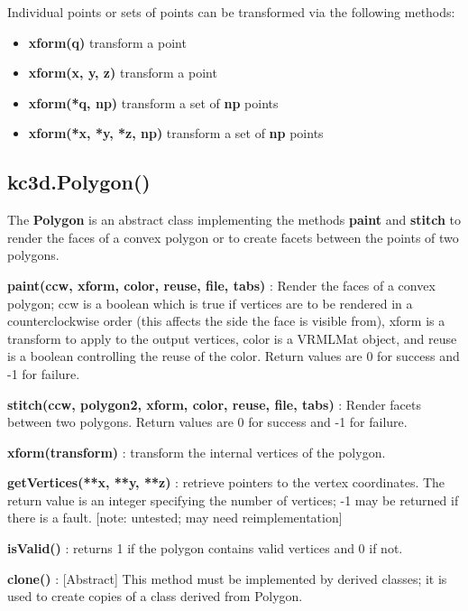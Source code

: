 \documentclass[a4paper, dvipdfm]{article}
\begin{document}
Individual points or sets of points can be transformed via the following methods:

\begin{itemize}
\item \textbf{xform(q)} transform a point\\
\item \textbf{xform(x, y, z)} transform a point\\
\item \textbf{xform(*q, np)} transform a set of \textbf{np} points\\
\item \textbf{xform(*x, *y, *z, np)} transform a set of \textbf{np} points\\
\end{itemize}

\subsection{kc3d.Polygon()}
The \textbf{Polygon} is an abstract class implementing the methods \textbf{paint}
and \textbf{stitch} to render the faces of a convex polygon or to create facets
between the points of two polygons.

\textbf{paint(ccw, xform, color, reuse, file, tabs)} : Render the faces of a convex polygon;
ccw is a boolean which is true if vertices are to be rendered in a counterclockwise order (this
affects the side the face is visible from), xform is a transform to apply to the output vertices,
color is a VRMLMat object, and reuse is a boolean controlling the reuse of the color.
Return values are 0 for success and -1 for failure.

\textbf{stitch(ccw, polygon2, xform, color, reuse, file, tabs)} : Render facets between two
polygons. Return values are 0 for success and -1 for failure.

\textbf{xform(transform)} : transform the internal vertices of the polygon.

\textbf{getVertices(**x, **y, **z)} : retrieve pointers to the vertex coordinates.
The return value is an integer specifying the number of vertices; -1 may be returned
if there is a fault. [note: untested; may need reimplementation]

\textbf{isValid()} : returns 1 if the polygon contains valid vertices and 0 if not.

\textbf{clone()} : [Abstract] This method must be implemented by derived classes;
it is used to create copies of a class derived from Polygon.
\end{document}
